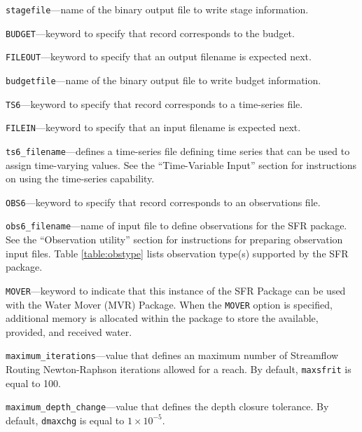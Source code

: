 \item \texttt{stagefile}---name of the binary output file to write stage information.

\item \texttt{BUDGET}---keyword to specify that record corresponds to the budget.

\item \texttt{FILEOUT}---keyword to specify that an output filename is expected next.

\item \texttt{budgetfile}---name of the binary output file to write budget information.

\item \texttt{TS6}---keyword to specify that record corresponds to a time-series file.

\item \texttt{FILEIN}---keyword to specify that an input filename is expected next.

\item \texttt{ts6\_filename}---defines a time-series file defining time series that can be used to assign time-varying values. See the ``Time-Variable Input'' section for instructions on using the time-series capability.

\item \texttt{OBS6}---keyword to specify that record corresponds to an observations file.

\item \texttt{obs6\_filename}---name of input file to define observations for the SFR package. See the ``Observation utility'' section for instructions for preparing observation input files. Table \ref{table:obstype} lists observation type(s) supported by the SFR package.

\item \texttt{MOVER}---keyword to indicate that this instance of the SFR Package can be used with the Water Mover (MVR) Package.  When the \texttt{MOVER} option is specified, additional memory is allocated within the package to store the available, provided, and received water.

\item \texttt{maximum\_iterations}---value that defines an maximum number of Streamflow Routing Newton-Raphson iterations allowed for a reach. By default, \texttt{maxsfrit} is equal to 100.

\item \texttt{maximum\_depth\_change}---value that defines the depth closure tolerance. By default, \texttt{dmaxchg} is equal to $1 \times 10^{-5}$.


